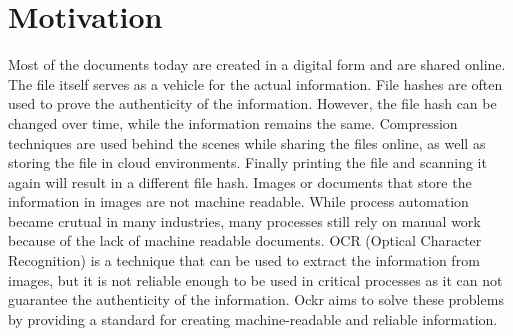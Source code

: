 \documentclass[../ockr-specification.tex]{subfiles}
\begin{document}
\section{Motivation}

Most of the documents today are created in a digital form and are shared online. 
The file itself serves as a vehicle for the actual information. File hashes are often used to prove the authenticity of the information.
However, the file hash can be changed over time, while the information remains the same. Compression techniques are used behind the scenes
while sharing the files online, as well as storing the file in cloud environments. Finally printing the file and scanning it again will result in a different file hash.
Images or documents that store the information in images are not machine readable. While process automation became crutual in many industries,
many processes still rely on manual work because of the lack of machine readable documents. OCR (Optical Character Recognition) is a technique that
can be used to extract the information from images, but it is not reliable enough to be used in critical processes as 
it can not guarantee the authenticity of the information. Ockr aims to solve these problems by providing a standard for creating machine-readable and reliable information.
\newpage
\end{document}
